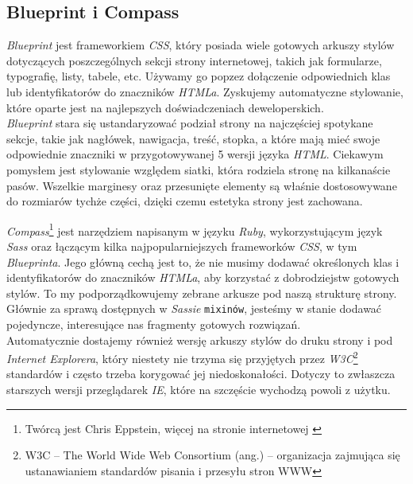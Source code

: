 \documentclass[a4paper,12pt]{article}
\begin{document}
\subsection{Blueprint i Compass}
\emph{Blueprint} jest frameworkiem \emph{CSS}, który posiada wiele gotowych arkuszy stylów
dotyczących poszczególnych sekcji strony internetowej, takich jak formularze, typografię,
listy, tabele, etc. Używamy go popzez dołączenie odpowiednich klas lub identyfikatorów do
znaczników \emph{HTMLa}. Zyskujemy automatyczne stylowanie, które oparte jest na
najlepszych doświadczeniach deweloperskich.\\
\emph{Blueprint} stara się ustandaryzować podział strony na najczęściej spotykane sekcje,
takie jak nagłówek, nawigacja, treść, stopka, a które mają mieć swoje odpowiednie
znaczniki w przygotowywanej 5 wersji języka \emph{HTML}. Ciekawym pomysłem jest
stylowanie względem siatki, która rodziela stronę na kilkanaście pasów. Wszelkie marginesy
oraz przesunięte elementy są właśnie dostosowywane do rozmiarów tychże części, dzięki czemu
estetyka strony jest zachowana.


\emph{Compass}\footnote{Twórcą jest Chris Eppstein, więcej na stronie internetowej
\cite{compass}} jest narzędziem napisanym w języku \emph{Ruby}, wykorzystującym język
\emph{Sass} oraz łączącym kilka najpopularniejszych frameworków \emph{CSS}, w tym
\emph{Blueprinta}. Jego główną cechą jest to, że nie musimy dodawać określonych klas i
identyfikatorów do znaczników \emph{HTMLa}, aby korzystać z dobrodziejstw gotowych stylów.
To my podporządkowujemy zebrane arkusze pod naszą strukturę strony. Głównie za sprawą
dostępnych w \emph{Sassie} \texttt{mixinów}, jesteśmy w stanie dodawać pojedyncze,
interesujące nas fragmenty gotowych rozwiązań.\\
Automatycznie dostajemy również wersję arkuszy stylów do druku strony i pod \emph{Internet
Explorera}, który niestety nie trzyma się przyjętych przez \emph{W3C}\footnote{W3C -- The
World Wide Web Consortium (ang.) -- organizacja zajmująca się ustanawianiem standardów pisania i
przesyłu stron WWW} standardów i często trzeba korygować jej niedoskonałości. Dotyczy to
zwłaszcza starszych wersji przeglądarek \emph{IE}, które na szczęście wychodzą powoli z
użytku.
\end{document}
